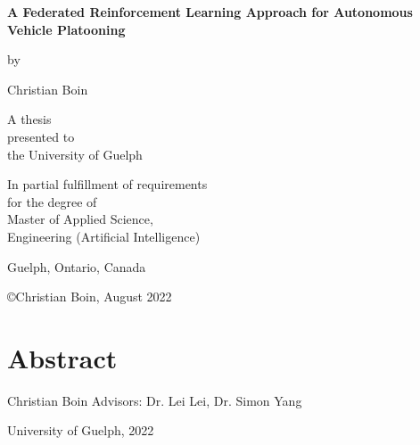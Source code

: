 \documentclass[oneside, 12pt]{book}
\begin{document}
\begin{titlepage}
	\setlength{\parskip}{12pt}
	\centering
	{\textbf{\LARGE A Federated Reinforcement Learning Approach for Autonomous Vehicle Platooning}\par}
	\vspace{1.5 cm}
	{by}\par
	\vspace{1 cm}
	{Christian Boin}\par
	\vspace{2cm}
	{A thesis\\
	presented to\\
	the University of Guelph}\par
	\vspace{2cm}
	{In partial fulfillment of requirements\\
	for the degree of\\
	Master of Applied Science,\\
	Engineering (Artificial Intelligence)}\par
	\vspace{2cm}
	{\normalsize Guelph, Ontario, Canada}\par
	\vspace{0.25cm}
	{\copyright\hspace{6pt}Christian Boin, August 2022}\par
\end{titlepage}
\chapter*{Abstract}
\noindent Christian Boin \hfill Advisors: Dr. Lei Lei, Dr. Simon Yang

\noindent University of Guelph, 2022
\vspace{12pt}
\end{document}
